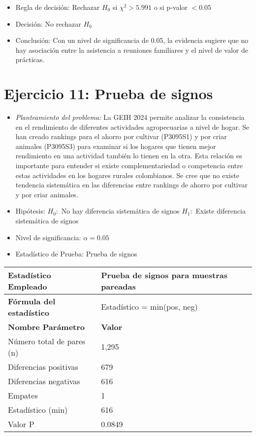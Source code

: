 \documentclass[12pt,a4paper]{article}
\begin{document}
\begin{itemize}
    \item Regla de decisión: Rechazar $H_0$ si $\chi^2 > 5.991$ o si p-valor $< 0.05$
    \item Decisión: No rechazar $H_0$
    \item Conclusión: Con un nivel de significancia de 0.05, la evidencia sugiere que no hay asociación entre la asistencia a reuniones familiares y el nivel de valor de prácticas.
\end{itemize}

\section*{Ejercicio 11: Prueba de signos}
\begin{itemize}
    \item \textit{Planteamiento del problema:} La GEIH 2024 permite analizar la consistencia en el rendimiento de diferentes actividades agropecuarias a nivel de hogar. Se han creado rankings para el ahorro por cultivar (P3095S1) y por criar animales (P3095S3) para examinar si los hogares que tienen mejor rendimiento en una actividad también lo tienen en la otra. Esta relación es importante para entender si existe complementariedad o competencia entre estas actividades en los hogares rurales colombianos. Se cree que no existe tendencia sistemática en las diferencias entre rankings de ahorro por cultivar y por criar animales.
    \item Hipótesis: \quad $H_{0}:$ No hay diferencia sistemática de signos \hspace{1cm} $H_{1}:$ Existe diferencia sistemática de signos
    \item Nivel de significancia: $\alpha = 0.05$
    \item Estadístico de Prueba: Prueba de signos
\end{itemize}

\begin{tabular}{|m{7cm}|m{7cm}|}
\hline
\textbf{Estadístico Empleado} & Prueba de signos para muestras pareadas \\ \hline
\textbf{Fórmula del estadístico} & Estadístico = min(pos, neg) \\ \hline
\textbf{Nombre Parámetro} & \textbf{Valor} \\ \hline
Número total de pares (n) & 1,295 \\ \hline
Diferencias positivas & 679 \\ \hline
Diferencias negativas & 616 \\ \hline
Empates & 1 \\ \hline
Estadístico (min) & 616 \\ \hline
Valor P & 0.0849 \\ \hline
\end{tabular}
\end{document}
